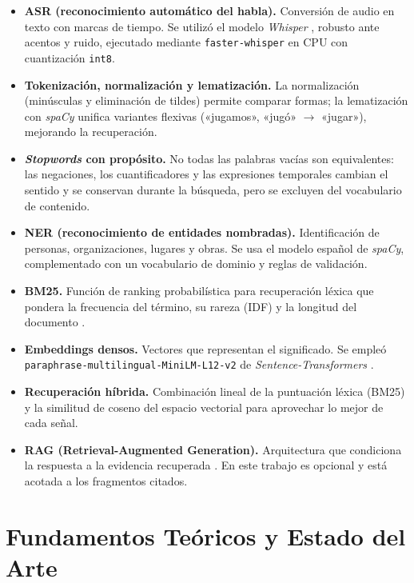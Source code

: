 \documentclass[12pt,a4paper]{article}
\begin{document}
\begin{itemize}
  \item \textbf{ASR (reconocimiento automático del habla).} Conversión de audio en texto con marcas de tiempo. Se utilizó el modelo \emph{Whisper} \cite{whisper}, robusto ante acentos y ruido, ejecutado mediante \texttt{faster-whisper} en CPU con cuantización \texttt{int8}.
  \item \textbf{Tokenización, normalización y lematización.} La normalización (minúsculas y eliminación de tildes) permite comparar formas; la lematización con \emph{spaCy} unifica variantes flexivas («jugamos», «jugó» $\rightarrow$ «jugar»), mejorando la recuperación.
  \item \textbf{\emph{Stopwords} con propósito.} No todas las palabras vacías son equivalentes: las negaciones, los cuantificadores y las expresiones temporales cambian el sentido y se conservan durante la búsqueda, pero se excluyen del vocabulario de contenido.
  \item \textbf{NER (reconocimiento de entidades nombradas).} Identificación de personas, organizaciones, lugares y obras. Se usa el modelo español de \emph{spaCy}, complementado con un vocabulario de dominio y reglas de validación.
  \item \textbf{BM25.} Función de ranking probabilística para recuperación léxica que pondera la frecuencia del término, su rareza (IDF) y la longitud del documento \cite{bm25}.
  \item \textbf{Embeddings densos.} Vectores que representan el significado. Se empleó \texttt{paraphrase-\allowbreak multilingual-\allowbreak MiniLM-L12-v2} de \emph{Sentence-Transformers} \cite{sbert}.
  \item \textbf{Recuperación híbrida.} Combinación lineal de la puntuación léxica (BM25) y la similitud de coseno del espacio vectorial para aprovechar lo mejor de cada señal.
  \item \textbf{RAG (Retrieval-Augmented Generation).} Arquitectura que condiciona la respuesta a la evidencia recuperada \cite{rag}. En este trabajo es opcional y está acotada a los fragmentos citados.
\end{itemize}

\section{Fundamentos Teóricos y Estado del Arte}
\label{sec:fundamentos}
\end{document}

